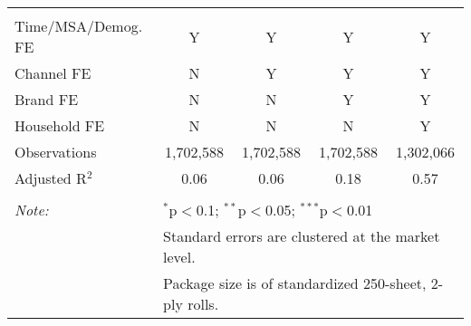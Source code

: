 \begin{table}[!htbp]
\begin{tabular}{@{\extracolsep{5pt}}lcccc}
 \hline \\[-1.8ex] 
Time/MSA/Demog. FE & Y & Y & Y & Y \\ 
Channel FE & N & Y & Y & Y \\ 
Brand FE & N & N & Y & Y \\ 
Household FE & N & N & N & Y \\ 
Observations & 1,702,588 & 1,702,588 & 1,702,588 & 1,302,066 \\ 
Adjusted R$^{2}$ & 0.06 & 0.06 & 0.18 & 0.57 \\ 
\hline 
\hline \\[-1.8ex] 
\textit{Note:}  & \multicolumn{4}{l}{$^{*}$p$<$0.1; $^{**}$p$<$0.05; $^{***}$p$<$0.01} \\ 
 & \multicolumn{4}{l}{Standard errors are clustered at the market level.} \\ 
 & \multicolumn{4}{l}{Package size is of standardized 250-sheet, 2-ply rolls.} \\ 
\end{tabular} 
\end{table} 

